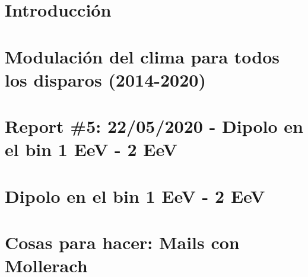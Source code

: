 \documentclass{ibtesis}
\begin{document}
\chapter{Introducción}
\graphicspath{{report_0_Introduccion/}}


% 

% 

% 

\chapter{Modulación del clima para todos los disparos (2014-2020)}
\graphicspath{{report_4_12_05_2020/}}


\chapter{Report \#5: 22/05/2020 - Dipolo en el bin 1 EeV - 2 EeV}
\graphicspath{{report_5_22_05_2020/}}


\chapter{Dipolo en el bin 1 EeV - 2 EeV}
\graphicspath{{report_6_02_06_2020/}}




\appendix
\chapter{Cosas para hacer:  Mails con Mollerach}



% 

\begin{biblio}
	
\end{biblio}
\end{document}
